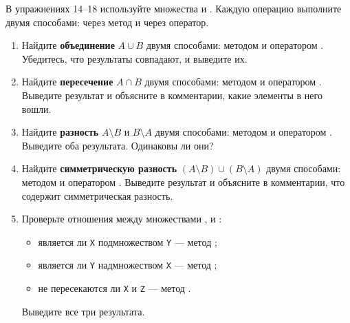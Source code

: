 \documentclass[a4,12pt]{article}
\theoremstyle{remark}
\begin{document}
\begin{exercisecomment}[title=Раздел 4. Операции над множествами]
В упражнениях 14--18 используйте множества {} и {}.
Каждую операцию выполните двумя способами: через метод и через оператор.
\end{exercisecomment}

\begin{enumerate}[resume]

    \item Найдите \textbf{объединение} $A \cup B$ двумя способами: методом {} и оператором {\color{blue}{\texttt{|}}}. Убедитесь, что результаты совпадают, и выведите их.

    \item Найдите \textbf{пересечение} $A \cap B$ двумя способами: методом {} и оператором {\color{blue}{\texttt{\&}}}. Выведите результат и объясните в комментарии, какие элементы в него вошли.

    \item Найдите \textbf{разность} $A \setminus B$ и $B \setminus A$ двумя способами: методом {} и оператором {\color{blue}{\texttt{-}}}. Выведите оба результата. Одинаковы ли они?

    \item Найдите \textbf{симметрическую разность} $(A \setminus B) \cup (B \setminus A)$ двумя способами: методом {} и оператором {\color{blue}{\texttt{\^{}}}}. Выведите результат и объясните в комментарии, что содержит симметрическая разность.

    \item Проверьте отношения между множествами {}, {} и {}:
    \begin{itemize}
        \item является ли \texttt{X} подмножеством \texttt{Y} --- метод {};
        \item является ли \texttt{Y} надмножеством \texttt{X} --- метод {};
        \item не пересекаются ли \texttt{X} и \texttt{Z} --- метод {}.
    \end{itemize}
    Выведите все три результата.

\end{enumerate}
\end{document}
